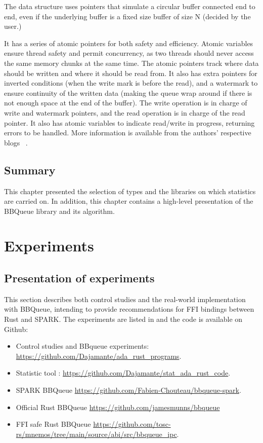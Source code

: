 \documentclass[nomenclature, english, bibtex]{kththesis}
\begin{document}
The data structure uses pointers that simulate a circular buffer connected end to end, even if the underlying buffer is a fixed size buffer of size N (decided by the user.)  

It has a series of atomic pointers for both safety and efficiency. Atomic variables ensure thread safety and permit concurrency, as two threads should never access the same memory chunks at the same time. The atomic pointers track where data should be written and where it should be read from. It also has extra pointers for inverted conditions (when the write mark is before the read), and a watermark to ensure continuity of the written data (making the queue wrap around if there is not enough space at the end of the buffer).  The write operation is in charge of write and watermark pointers, and the read operation is in charge of the read pointer. It also has atomic variables to indicate read/write in progress, returning errors to be handled. More information is available from the authors' respective blogs ~\cite{chouteau_rust_2021, munns_design_2019}.

\section{Summary}

This chapter presented the selection of types and the libraries on which statistics are carried on. In addition, this chapter contains a high-level presentation of the BBQueue library and its algorithm.

\cleardoublepage
\chapter{Experiments}
\label{ch:whatYouDid}

\section{Presentation of experiments}

This section describes both control studies and the real-world implementation with BBQueue, intending to provide recommendations for FFI bindings between Rust and SPARK. The experiments are listed in 
and the code is available on Github:
\label{sec:systemDocumentation}
\begin{itemize}
    \item Control studies and BBqueue experiments: 
        \url{https://github.com/Dajamante/ada_rust_programs}.
    \item Statistic tool : 
        \url{https://github.com/Dajamante/stat_ada_rust_code}.
    \item SPARK BBQueue 
        \url{https://github.com/Fabien-Chouteau/bbqueue-spark}.
    \item Official Rust BBQueue 
        \url{https://github.com/jamesmunns/bbqueue}
    \item FFI safe Rust BBQueue
        \url{https://github.com/tosc-rs/mnemos/tree/main/source/abi/src/bbqueue_ipc}.
\end{itemize}
\end{document}
